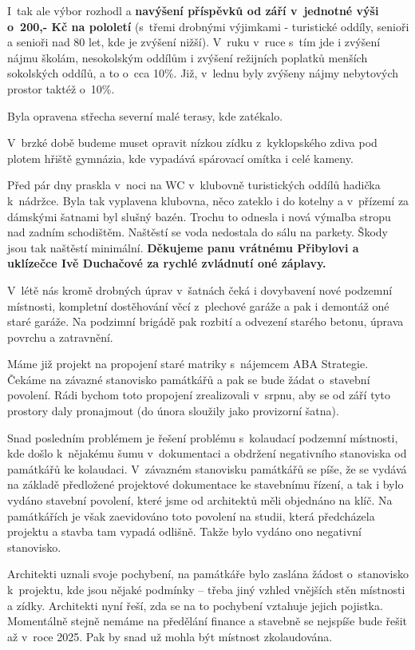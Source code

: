 \documentclass[11pt]{article}
\begin{document}
I~tak ale výbor rozhodl a \textbf{navýšení příspěvků od září v~jednotné výši o~200,- Kč na pololetí} (s~třemi drobnými výjimkami - turistické oddíly, senioři a senioři nad 80 let, kde je zvýšení nižší). V~ruku v~ruce s~tím jde i zvýšení nájmu školám, nesokolským oddílům i zvýšení režijních poplatků menších sokolských oddílů, a to o~cca 10\%. Již, v~lednu byly zvýšeny nájmy nebytových prostor taktéž o~10\%.

Byla opravena střecha severní malé terasy, kde zatékalo.

V~brzké době budeme muset opravit nízkou zídku z~kyklopského zdiva pod plotem hřiště gymnázia, kde vypadává spárovací omítka i celé kameny.

Před pár dny praskla v~noci na WC v~klubovně turistických oddílů hadička k~nádržce. Byla tak vyplavena klubovna, něco zateklo i do kotelny a v~přízemí za dámskými šatnami byl slušný bazén. Trochu to odnesla i nová výmalba stropu nad zadním schodištěm. Naštěstí se voda nedostala do sálu na parkety. Škody jsou tak naštěstí minimální. \textbf{Děkujeme panu vrátnému Přibylovi a uklízečce Ivě Duchačové za rychlé zvládnutí oné záplavy.}

V~létě nás kromě drobných úprav v~šatnách čeká i dovybavení nové podzemní místnosti, kompletní dostěhování věcí z~plechové garáže a pak i demontáž oné staré garáže. Na podzimní brigádě pak rozbití a odvezení starého betonu, úprava povrchu a zatravnění. 

Máme již projekt na propojení staré matriky s~nájemcem ABA Strategie. Čekáme na závazné stanovisko památkářů a pak se bude žádat o~stavební povolení. Rádi bychom toto propojení zrealizovali v~srpnu, aby se od září tyto prostory daly pronajmout (do února sloužily jako provizorní šatna).

Snad posledním problémem je řešení problému s~kolaudací podzemní místnosti, kde došlo k~nějakému šumu v~dokumentaci a obdržení negativního stanoviska od památkářů ke kolaudaci. V~závazném stanovisku památkářů se píše, že se vydává na základě předložené projektové dokumentace ke stavebnímu řízení, a tak i bylo vydáno stavební povolení, které jsme od architektů měli objednáno na klíč. Na památkářích je však zaevidováno toto povolení na studii, která předcházela projektu a stavba tam vypadá odlišně. Takže bylo vydáno ono negativní stanovisko. 

Architekti uznali svoje pochybení, na památkáře bylo zaslána žádost o~stanovisko k~projektu, kde jsou nějaké podmínky – třeba jiný vzhled vnějších stěn místnosti a zídky. Architekti nyní řeší, zda se na to pochybení vztahuje jejich pojistka. Momentálně stejně nemáme na předělání finance a stavebně se nejspíše bude řešit až v~roce 2025. Pak by snad už mohla být místnost zkolaudována.
\end{document}
